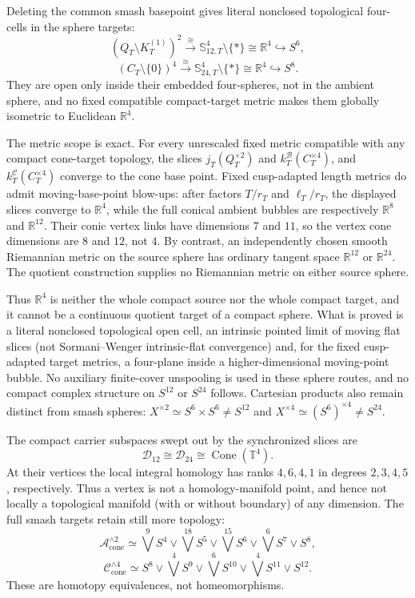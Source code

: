 \documentclass[10pt,letterpaper]{article}
\begin{document}
Deleting the common smash basepoint gives literal nonclosed topological
four-cells in the sphere targets:
\[
 (Q_T\setminus K_T^{(1)})^2
 \xrightarrow{\ \cong\ }
 \mathbb S_{12,T}^4\setminus\{*\}
 \cong\mathbb R^4\hookrightarrow S^6,
\]
\[
 (C_T\setminus\{0\})^4
 \xrightarrow{\ \cong\ }
 \mathbb S_{24,T}^4\setminus\{*\}
 \cong\mathbb R^4\hookrightarrow S^8.
\]
They are open only inside their embedded four-spheres, not in the ambient
sphere, and no fixed compatible compact-target metric makes them globally
isometric to Euclidean $\mathbb R^4$.

The metric scope is exact.  For every unrescaled fixed metric compatible
with any compact cone-target topology, the slices $j_T(Q_T^{\times2})$ and
$k_T^{\mathcal B}(C_T^{\times4})$,
and $k_T^{\mathcal C}(C_T^{\times4})$ converge to the cone base point.
Fixed cusp-adapted
length metrics do admit moving-base-point blow-ups: after factors
$T/r_T$ and $\ell_T/r_T$, the displayed slices converge to
$\mathbb R^4$, while the full conical ambient bubbles are respectively
$\mathbb R^8$ and $\mathbb R^{12}$.  Their conic vertex links have
dimensions $7$ and $11$, so the vertex cone dimensions are $8$ and $12$,
not $4$.  By contrast, an independently chosen smooth Riemannian metric on
the source sphere has ordinary tangent space $\mathbb R^{12}$ or
$\mathbb R^{24}$.  The quotient construction supplies no Riemannian metric
on either source sphere.

Thus $\mathbb R^4$ is neither the whole compact source nor the whole compact
target, and it cannot be a continuous quotient target of a compact sphere.
What is proved is a literal nonclosed topological open cell, an intrinsic
pointed limit of moving flat slices (not Sormani--Wenger
intrinsic-flat convergence) and, for the fixed cusp-adapted target metrics,
a four-plane inside a higher-dimensional moving-point bubble.  No auxiliary
finite-cover unspooling is used in these sphere routes, and no compact
complex structure on $S^{12}$ or $S^{24}$ follows.  Cartesian products also
remain distinct from smash spheres:
$X^{\times2}\simeq S^6\times S^6\ne S^{12}$ and
$X^{\times4}\simeq(S^6)^{\times4}\ne S^{24}$.

The compact carrier subspaces swept out by the synchronized slices are
\[
 \mathcal D_{12}\cong\mathcal D_{24}\cong\operatorname{Cone}(\mathbb T^4).
\]
At their vertices the local integral homology has ranks $4,6,4,1$ in
degrees $2,3,4,5$, respectively.  Thus a vertex is not a
homology-manifold point, and hence not locally a topological manifold (with
or without boundary) of any dimension.  The full smash targets retain still
more topology:
\[
 \mathcal A_{\mathrm{cone}}^{\wedge2}\simeq
 \bigvee^9S^4\vee\bigvee^{18}S^5\vee\bigvee^{15}S^6
 \vee\bigvee^6S^7\vee S^8,
\]
\[
 \mathcal C_{\mathrm{cone}}^{\wedge4}\simeq
 S^8\vee\bigvee^4S^9\vee\bigvee^6S^{10}
 \vee\bigvee^4S^{11}\vee S^{12}.
\]
These are homotopy equivalences, not homeomorphisms.
\end{document}
